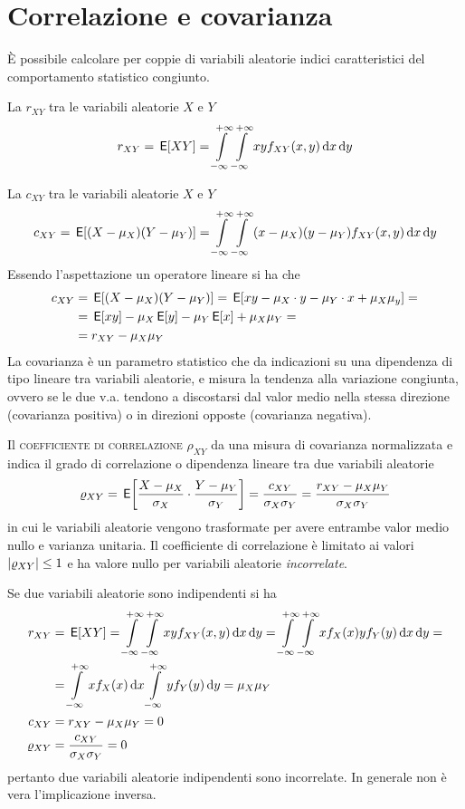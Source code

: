 \section{Correlazione e covarianza}
\`{E} possibile calcolare per coppie di variabili aleatorie indici caratteristici del comportamento statistico congiunto.

La  $r_{XY}$ tra le variabili aleatorie $X$ e $Y$
\begin{equation}\label{eq:v_a_correlazione}
r_{XY}=\,{\operatorname{\mathsf{E}}}\!\left[{X Y}\right]=\int\limits_{-\infty}^{+\infty}{\int\limits_{-\infty}^{+\infty}{x y f_{XY}(x,y)}{\,\mathop{}\!\mathrm{d}{x}}}{\,\mathop{}\!\mathrm{d}{y}}
\end{equation}

La  $c_{XY}$ tra le variabili aleatorie $X$ e $Y$
\begin{equation}\label{eq:v_a_covarianza}
c_{XY}=\,{\operatorname{\mathsf{E}}}\!\left[{(X-\mu_X)(Y-\mu_Y)}\right]=\int\limits_{-\infty}^{+\infty}{\int\limits_{-\infty}^{+\infty}{(x-\mu_X)(y-\mu_Y)f_{XY}(x,y)}{\,\mathop{}\!\mathrm{d}{x}}}{\,\mathop{}\!\mathrm{d}{y}}
\end{equation}
Essendo l'aspettazione un operatore lineare si ha che 
\begin{equation}\begin{split}
c_{XY}&=\,{\operatorname{\mathsf{E}}}\!\left[{(X-\mu_X)(Y-\mu_Y)}\right]=\,{\operatorname{\mathsf{E}}}\!\left[{x y-\mu_X\cdot y-\mu_Y\cdot x+\mu_X\mu_y}\right]=\\
&=\,{\operatorname{\mathsf{E}}}\!\left[{x y}\right]-\mu_X \,{\operatorname{\mathsf{E}}}\!\left[{y}\right]-\mu_Y \,{\operatorname{\mathsf{E}}}\!\left[{x}\right]+\mu_X\mu_Y=\\&=r_{XY}-\mu_X\mu_Y\end{split}\end{equation}
La covarianza è un parametro statistico che da indicazioni su una dipendenza di tipo lineare tra variabili aleatorie, e misura la tendenza alla variazione congiunta, ovvero se le due v.a. tendono a discostarsi dal valor medio nella stessa direzione (covarianza positiva) o in direzioni opposte (covarianza negativa).

Il \textsc{coefficiente di correlazione} $\rho_{XY}$ da una misura di covarianza normalizzata e indica il grado di correlazione o dipendenza lineare tra due variabili aleatorie
\begin{equation}
\varrho_{XY}=\,{\operatorname{\mathsf{E}}}\!\left[{\frac{X-\mu_X}{\sigma_X}\cdot\frac{Y-\mu_Y}{\sigma_Y}}\right]=\frac{c_{XY}}{\sigma_X\sigma_Y}=\frac{r_{XY}-\mu_X\mu_Y}{\sigma_X\sigma_Y}
\end{equation}
in cui le variabili aleatorie vengono trasformate per avere entrambe valor medio nullo e varianza unitaria. Il coefficiente di correlazione è limitato ai valori $\left|{\varrho_{XY}}\right|\leq 1$ e ha valore nullo per variabili aleatorie \emph{incorrelate}.

Se due variabili aleatorie sono indipendenti si ha
\[\begin{split}
r_{XY}&=\,{\operatorname{\mathsf{E}}}\!\left[{X Y}\right]=\int\limits_{-\infty}^{+\infty}{\int\limits_{-\infty}^{+\infty}{x y f_{XY}(x,y)}{\,\mathop{}\!\mathrm{d}{x}}}{\,\mathop{}\!\mathrm{d}{y}}=\int\limits_{-\infty}^{+\infty}{\int\limits_{-\infty}^{+\infty}{x f_{X}(x) y f_{Y}(y)}{\,\mathop{}\!\mathrm{d}{x}}}{\,\mathop{}\!\mathrm{d}{y}}=\\
&=\int\limits_{-\infty}^{+\infty}{x f_{X}(x)}{\,\mathop{}\!\mathrm{d}{x}}\int\limits_{-\infty}^{+\infty}{y f_{Y}(y)}{\,\mathop{}\!\mathrm{d}{y}}=\mu_X\mu_Y\\
c_{XY}&=r_{XY}-\mu_X\mu_Y=0\\
\varrho_{XY}&=\frac{c_{XY}}{\sigma_X\sigma_Y}=0
\end{split}\]
pertanto due variabili aleatorie indipendenti sono incorrelate. In generale non è vera l'implicazione inversa.

